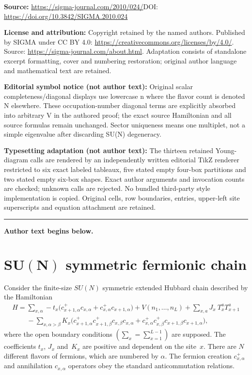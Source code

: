 \documentclass[11pt]{article}
\begin{document}
\noindent\textbf{Source:} \url{https://sigma-journal.com/2010/024/}\quad DOI: \url{https://doi.org/10.3842/SIGMA.2010.024}\par
\noindent\textbf{License and attribution:} Copyright retained by the named authors. Published by SIGMA under CC BY 4.0: \url{https://creativecommons.org/licenses/by/4.0/}. Source: \url{https://sigma-journal.com/about.html}. Adaptation consists of standalone excerpt formatting, cover and numbering restoration; original author language and mathematical text are retained.\par
\noindent\textbf{Editorial symbol notice (not author text):} Original scalar completeness/diagonal displays use lowercase n where the flavor count is denoted N elsewhere. These occupation-number diagonal terms are explicitly absorbed into arbitrary V in the authored proof; the exact source Hamiltonian and all source formulas remain unchanged. Sector uniqueness means one multiplet, not a simple eigenvalue after discarding SU(N) degeneracy.\par
\noindent\textbf{Typesetting adaptation (not author text):} The thirteen retained Young-diagram calls are rendered by an independently written editorial TikZ renderer restricted to six exact labeled tableaux, five stated empty four-box partitions and two stated empty six-box shapes. Exact author arguments and invocation counts are checked; unknown calls are rejected. No bundled third-party style implementation is copied. Original cells, row boundaries, entries, upper-left site superscripts and equation attachment are retained.\par
\medskip\hrule\medskip\noindent\textbf{Author text begins below.}\par
\setcounter{section}{1}
\setcounter{subsection}{0}
\setcounter{subsubsection}{0}
\setcounter{equation}{0}
\section[$SU(N)$ symmetric fermionic chain]{$\boldsymbol{SU(N)}$ symmetric fermionic chain}\label{section2}

Consider the f\/inite-size $SU(N)$ symmetric extended Hubbard chain described by the Hamiltonian
\begin{gather}
H=\sum_{x,\alpha} -t_x\big( c^+_{x+1,\alpha}c_{x,\alpha} + c^+_{x,\alpha}c_{x+1,\alpha}\big)
+  V(n_1,\dots,n_L) + \sum_{x,a} J_x\ T_x^a  T_{x+1}^a\nonumber
\\
\phantom{H=}{}- \sum_{x,\alpha>\beta} K_x\big(
c^+_{x+1,\alpha} c^+_{x+1,\beta} c_{x,\beta} c_{x,\alpha}
+ c^+_{x,\alpha} c^+_{x,\beta} c_{x+1,\beta} c_{x+1,\alpha}\big),\label{H}
\end{gather}
where the open boundary conditions $\left(\sum_x=\sum_{x=1}^{L-1}\right)$ are supposed.
The coef\/f\/icients $t_x$, $J_x$ and~$K_x$ are positive and dependent on the site~$x$.
There are $N$ dif\/ferent f\/lavors of fermions, which are numbered by $\alpha$.
The fermion  creation  $c^+_{x,\alpha}$ and annihilation  $c_{x,\alpha}$ operators
obey the standard  anticommutation relations.
\end{document}
